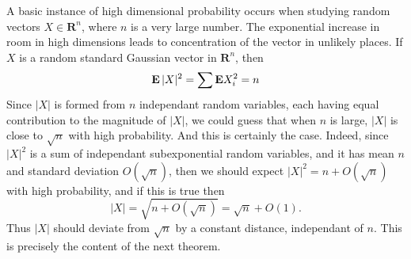 A basic instance of high dimensional probability occurs when studying random vectors $X \in \mathbf{R}^n$, where $n$ is a very large number. The exponential increase in room in high dimensions leads to concentration of the vector in unlikely places. If $X$ is a random standard Gaussian vector in $\mathbf{R}^n$, then
%
\[ \operatorname{\mathbf{E}} |X|^2 = \sum \mathbf{E} X_i^2 = n \]
%
Since $|X|$ is formed from $n$ independant random variables, each having equal contribution to the magnitude of $|X|$, we could guess that when $n$ is large, $|X|$ is close to $\sqrt{n}$ with high probability. And this is certainly the case. Indeed, since $|X|^2$ is a sum of independant subexponential random variables, and it has mean $n$ and standard deviation $O(\sqrt{n})$, then we should expect $|X|^2 = n + O(\sqrt{n})$ with high probability, and if this is true then
%
\[ |X| = \sqrt{n + O \left(\sqrt{n}\right) } = \sqrt{n} + O(1). \]
%
Thus $|X|$ should deviate from $\sqrt{n}$ by a constant distance, independant of $n$. This is precisely the content of the next theorem.

